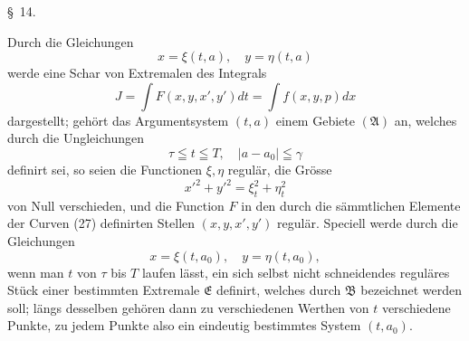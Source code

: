 \documentclass[11pt,a4paper,leqno]{article}
\begin{document}
\begin{center}{\large \S~14.}\end{center}

Durch die Gleichungen
\begin{equation}\tag{27}
x=\xi(t,a),\quad y=\eta(t,a)
\end{equation}
werde eine Schar von Extremalen des Integrals
\[
J=\int F(x,y,x',y')dt=\int f(x,y,p)dx
\]
dargestellt; gehört das Argumentsystem $(t,a)$ einem Gebiete $(\mathfrak{A})$ an, welches durch die Ungleichungen
\[
\tau\leqq t\leqq T,\quad |a-a_0|\leqq \gamma
\]
definirt sei, so seien die Functionen $\xi,\eta$ regulär, die Grösse
\[
x'^2+y'^2=\xi_t^2+\eta_t^2
\]
von Null verschieden, und die Function $F$ in den durch die sämmtlichen Elemente der Curven (27) definirten Stellen $(x,y,x',y')$ regulär. Speciell werde durch die Gleichungen
\[
x=\xi(t,a_0),\quad y=\eta(t,a_0),
\]
wenn man $t$ von $\tau$ bis $T$ laufen lässt, ein sich selbst nicht schneidendes reguläres Stück einer bestimmten Extremale $\mathfrak{E}$ definirt, welches durch $\mathfrak{B}$ bezeichnet werden soll; längs desselben gehören dann zu verschiedenen Werthen von $t$ verschiedene Punkte, zu jedem Punkte also ein eindeutig bestimmtes System $(t,a_0)$.
\end{document}

